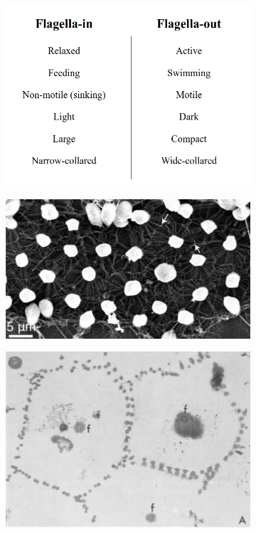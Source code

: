 \begin{figure}[htbp]
\begin{subfigure}[b]{0.18\textwidth}
		\caption{}
		\label{subfig:morphology}
	\end{subfigure}
	\begin{subfigure}[b]{0.3\textwidth}
		\centering
		\includegraphics[width=\textwidth]{table.png}
		\caption{}
		\label{subfig:table}
	\end{subfigure}
	\begin{subfigure}[b]{0.56\textwidth}
		\centering
		\includegraphics[width=\textwidth]{contact1.png}
		\caption{}
		\label{subfig:contact1}
	\end{subfigure}
	\begin{subfigure}[b]{0.43\textwidth}
		\centering
		\includegraphics[width=\textwidth]{contact2.png}

\end{subfigure}
\end{figure}
